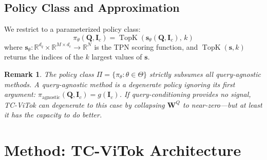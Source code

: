\documentclass[12pt,a4paper]{article}
\DeclareMathOperator{\TopK}{TopK}
\newcommand{\R}{\mathbb{R}}
\newcommand{\vs}{\mathbf{s}}     %
\newcommand{\mI}{\mathbf{I}}     %
\newcommand{\mQ}{\mathbf{Q}}     %
\newtheorem{remark}{Remark}
\begin{document}
\subsection{Policy Class and Approximation}

We restrict to a parameterized policy class:
\[
  \pi_\theta(\mQ, \mI_c) = \TopK\!\left(\vs_\theta(\mQ, \mI_c),\, k\right)
\]
where $\vs_\theta\colon \R^{d_q} \times \R^{M \times d_c} \to \R^N$ is the TPN
scoring function, and $\TopK(\vs, k)$ returns the indices of the $k$ largest
values of $\vs$.

\begin{remark}
  The policy class $\Pi = \{\pi_\theta : \theta \in \Theta\}$ strictly subsumes
  all query-agnostic methods. A query-agnostic method is a degenerate policy
  ignoring its first argument: $\pi_{\mathrm{agnostic}}(\mQ, \mI_c) = g(\mI_c)$.
  If query-conditioning provides no signal, TC-ViTok can degenerate to this case
  by collapsing $\mathbf{W}^Q$ to near-zero---but at least it has the capacity
  to do better.
\end{remark}

\section{Method: TC-ViTok Architecture}
\label{sec:architecture}
\end{document}
